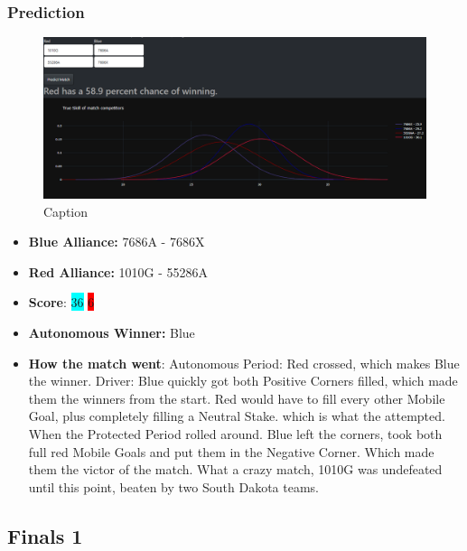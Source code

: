 \subsubsection*{Prediction}
\begin{figure}[H]
    \centering
    \includegraphics[width=0.8\linewidth]{images/SND.png}
    \caption{Caption}
    \label{fig:enter-label}
\end{figure}
\begin{itemize}
    \item \textbf{Blue Alliance:} 7686A - 7686X
    \item \textbf{Red Alliance:} 1010G - 55286A
    \item \textbf{Score}: \colorbox{cyan}{36}
    \colorbox{red}{6}
    \item \textbf{Autonomous Winner:} Blue
    \item \textbf{How the match went}: Autonomous Period: Red crossed, which makes Blue the winner. Driver: Blue quickly got both Positive Corners filled, which made them the winners from the start. Red would have to fill every other Mobile Goal, plus completely filling a Neutral Stake. which is what the attempted. When the Protected Period rolled around. Blue left the corners, took both full red Mobile Goals and put them in the Negative Corner. Which made them the victor of the match. What a crazy match, 1010G was undefeated until this point, beaten by two South Dakota teams.
\end{itemize}
\subsection*{Finals 1}
